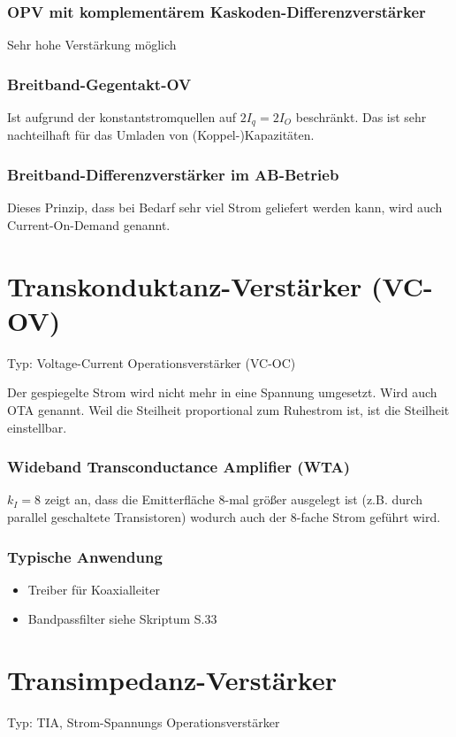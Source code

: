 \documentclass[a4paper]{article}
\begin{document}
\begin{itemize}
\subsubsection*{OPV mit komplementärem Kaskoden-Differenzverstärker}
Sehr hohe Verstärkung möglich

\subsubsection*{Breitband-Gegentakt-OV}
Ist aufgrund der konstantstromquellen auf $2I_{q}=2I_{O}$ beschränkt. Das ist sehr nachteilhaft für das Umladen von (Koppel-)Kapazitäten.

\subsubsection*{Breitband-Differenzverstärker im AB-Betrieb}
Dieses Prinzip, dass bei Bedarf sehr viel Strom geliefert werden kann, wird auch Current-On-Demand genannt.

\section*{Transkonduktanz-Verstärker (VC-OV)}
Typ: Voltage-Current Operationsverstärker (VC-OC)

Der gespiegelte Strom wird nicht mehr in eine Spannung umgesetzt.
Wird auch OTA genannt. Weil die Steilheit proportional zum Ruhestrom ist, ist 
die Steilheit einstellbar.

\subsubsection*{Wideband Transconductance Amplifier (WTA)}
$k_{I}=8$ zeigt an, dass die Emitterfläche 8-mal größer ausgelegt ist (z.B.
durch parallel geschaltete Transistoren) wodurch auch der 8-fache Strom geführt
 wird.

\subsubsection*{Typische Anwendung}
\begin{itemize}
    \item Treiber für Koaxialleiter
    \item Bandpassfilter
        siehe Skriptum S.33
\end{itemize}

\section*{Transimpedanz-Verstärker}
Typ: TIA, Strom-Spannungs Operationsverstärker


\end{itemize}
\end{document}
